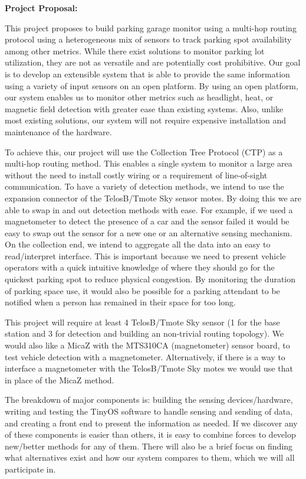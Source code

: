 \documentclass[12pt]{article}
\begin{document}
\centerline{\bf \large Project Proposal: }

This project proposes to build parking garage monitor using a multi-hop routing
protocol using a heterogeneous mix of sensors to track parking spot
availability among other metrics.
While there exist solutions to monitor parking lot utilization, they are not as
versatile and are potentially cost prohibitive.
Our goal is to develop an extensible system that is able to provide the same
information using a variety of input sensors on an open platform.
By using an open platform, our system enables us to monitor other metrics such
as headlight, heat, or magnetic field detection with greater ease than existing
systems.
Also, unlike most existing solutions, our system will not require expensive
installation and maintenance of the hardware.

To achieve this, our project will use the Collection Tree Protocol (CTP) as a
multi-hop routing method.
This enables a single system to monitor a large area without the need to
install costly wiring or a requirement of line-of-sight communication.
To have a variety of detection methods, we intend to use the expansion
connector of the TelosB/Tmote Sky sensor motes.
By doing this we are able to swap in and out detection methods with ease.
For example, if we used a magnetometer to detect the presence of a car and the
sensor failed it would be easy to swap out the sensor for a new one or an
alternative sensing mechanism.
On the collection end, we intend to aggregate all the data into an easy to
read/interpret interface.
This is important because we need to present vehicle operators with a quick
intuitive knowledge of where they should go for the quickest parking spot to
reduce physical congestion.
By monitoring the duration of parking space use, it would also be possible for
a parking attendant to be notified when a person has remained in their space
for too long.

This project will require at least 4 TelosB/Tmote Sky sensor (1 for the base
station and 3 for detection and building an non-trivial routing topology).
We would also like a MicaZ with the MTS310CA (magnetometer) sensor board, to
test vehicle detection with a magnetometer.
Alternatively, if there is a way to interface a magnetometer with the
TelosB/Tmote Sky motes we would use that in place of the MicaZ method.

The breakdown of major components is: building the sensing devices/hardware,
writing and testing the TinyOS software to handle sensing and sending of data,
and creating a front end to present the information as needed.
If we discover any of these components is easier than others, it is easy to
combine forces to develop new/better methods for any of them.
There will also be a brief focus on finding what alternatives exist and how our
system compares to them, which we will all participate in.
\end{document}
